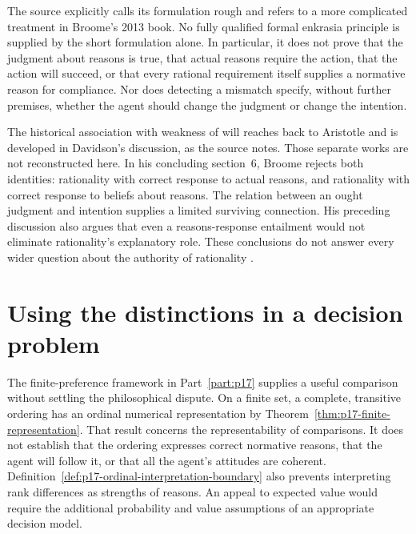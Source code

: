 The source explicitly calls its formulation rough and refers to a more
complicated treatment in Broome's 2013 book. No fully qualified formal
enkrasia principle is supplied by the short formulation alone. In particular,
it does not prove that the judgment about reasons is true, that actual
reasons require the action, that the action will succeed, or that every
rational requirement itself supplies a normative reason for compliance.
Nor does detecting a mismatch specify, without further premises, whether
the agent should change the judgment or change the intention.

The historical association with weakness of will reaches back to Aristotle
and is developed in Davidson's discussion, as the source notes. Those
separate works are not reconstructed here. In his concluding section~6,
Broome rejects both identities: rationality with correct response to actual
reasons, and rationality with correct response to beliefs about reasons.
The relation between an ought judgment and intention supplies a limited
surviving connection. His preceding discussion also argues that even a
reasons-response entailment would not eliminate rationality's explanatory
role. These conclusions do not answer every wider question about the
authority of rationality
\parencite[p.~134]{Broome2021ReasonsRationality}.

\section{Using the distinctions in a decision problem}
\label{sec:p11-reasons-diagnostic}

The finite-preference framework in Part~\ref{part:p17} supplies a useful comparison without
settling the philosophical dispute. On a finite set, a complete, transitive ordering has an
ordinal numerical representation by
Theorem~\ref{thm:p17-finite-representation}. That result concerns the
representability of comparisons. It does not establish that the ordering
expresses correct normative reasons, that the agent will follow it, or that
all the agent's attitudes are coherent. Definition~\ref{def:p17-ordinal-interpretation-boundary}
also prevents interpreting rank differences as strengths of reasons.
An appeal to expected value would require the additional probability and
value assumptions of an appropriate decision model.

